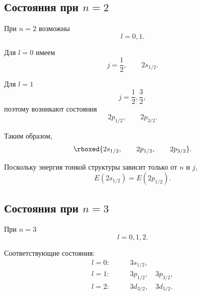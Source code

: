 \documentclass[../final.tex]{subfiles}
\begin{document}
\subsection*{Состояния при \texorpdfstring{$n=2$}{n = 2}}

При $n=2$ возможны
%
\begin{equation*}
    l=0,1.
\end{equation*}

Для $l=0$ имеем
%
\begin{equation*}
    j=\frac12,
    \qquad
    2s_{1/2}.
\end{equation*}

Для $l=1$
%
\begin{equation*}
    j
    =
    \frac12,
    \frac32,
\end{equation*}
%
поэтому возникают состояния
%
\begin{equation*}
    2p_{1/2},
    \qquad
    2p_{3/2}.
\end{equation*}

Таким образом,
%
\begin{equation*}
    \rboxed{
        2s_{1/2},
        \qquad
        2p_{1/2},
        \qquad
        2p_{3/2}
    }.
\end{equation*}

Поскольку энергия тонкой структуры зависит только от $n$ и $j$,
%
\begin{equation*}
    E(2s_{1/2})
    =
    E(2p_{1/2}).
\end{equation*}



\subsection*{Состояния при \texorpdfstring{$n=3$}{n = 3}}

При $n=3$
%
\begin{equation*}
    l=0,1,2.
\end{equation*}

Соответствующие состояния:
%
\begin{align*}
    l=0:
    &\qquad
    3s_{1/2},
    \\
    l=1:
    &\qquad
    3p_{1/2},
    \quad
    3p_{3/2},
    \\
    l=2:
    &\qquad
    3d_{3/2},
    \quad
    3d_{5/2}.
\end{align*}
\end{document}
